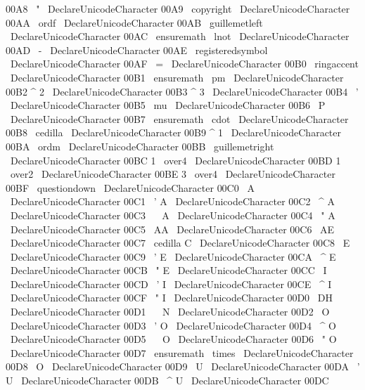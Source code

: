 {{{{{{
00A8
}
{
\
"
{
}
}
%
\
DeclareUnicodeCharacter
{
00A9
}
{
\
copyright
{
}
}
%
\
DeclareUnicodeCharacter
{
00AA
}
{
\
ordf
}
%
\
DeclareUnicodeCharacter
{
00AB
}
{
\
guillemetleft
{
}
}
%
\
DeclareUnicodeCharacter
{
00AC
}
{
\
ensuremath
\
lnot
}
%
\
DeclareUnicodeCharacter
{
00AD
}
{
\
-
}
%
\
DeclareUnicodeCharacter
{
00AE
}
{
\
registeredsymbol
{
}
}
%
\
DeclareUnicodeCharacter
{
00AF
}
{
\
=
{
}
}
%
%
\
DeclareUnicodeCharacter
{
00B0
}
{
\
ringaccent
{
}
}
%
\
DeclareUnicodeCharacter
{
00B1
}
{
\
ensuremath
\
pm
}
%
\
DeclareUnicodeCharacter
{
00B2
}
{
^
2
}
%
\
DeclareUnicodeCharacter
{
00B3
}
{
^
3
}
%
\
DeclareUnicodeCharacter
{
00B4
}
{
\
'
{
}
}
%
\
DeclareUnicodeCharacter
{
00B5
}
{
\
mu
}
%
\
DeclareUnicodeCharacter
{
00B6
}
{
\
P
}
%
\
DeclareUnicodeCharacter
{
00B7
}
{
\
ensuremath
\
cdot
}
%
\
DeclareUnicodeCharacter
{
00B8
}
{
\
cedilla
{
}
}
%
\
DeclareUnicodeCharacter
{
00B9
}
{
^
1
}
%
\
DeclareUnicodeCharacter
{
00BA
}
{
\
ordm
}
%
\
DeclareUnicodeCharacter
{
00BB
}
{
\
guillemetright
{
}
}
%
\
DeclareUnicodeCharacter
{
00BC
}
{
1
\
over4
}
%
\
DeclareUnicodeCharacter
{
00BD
}
{
1
\
over2
}
%
\
DeclareUnicodeCharacter
{
00BE
}
{
3
\
over4
}
%
\
DeclareUnicodeCharacter
{
00BF
}
{
\
questiondown
}
%
%
\
DeclareUnicodeCharacter
{
00C0
}
{
\
A
}
%
\
DeclareUnicodeCharacter
{
00C1
}
{
\
'
A
}
%
\
DeclareUnicodeCharacter
{
00C2
}
{
\
^
A
}
%
\
DeclareUnicodeCharacter
{
00C3
}
{
\
~
A
}
%
\
DeclareUnicodeCharacter
{
00C4
}
{
\
"
A
}
%
\
DeclareUnicodeCharacter
{
00C5
}
{
\
AA
}
%
\
DeclareUnicodeCharacter
{
00C6
}
{
\
AE
}
%
\
DeclareUnicodeCharacter
{
00C7
}
{
\
cedilla
{
C
}
}
%
\
DeclareUnicodeCharacter
{
00C8
}
{
\
E
}
%
\
DeclareUnicodeCharacter
{
00C9
}
{
\
'
E
}
%
\
DeclareUnicodeCharacter
{
00CA
}
{
\
^
E
}
%
\
DeclareUnicodeCharacter
{
00CB
}
{
\
"
E
}
%
\
DeclareUnicodeCharacter
{
00CC
}
{
\
I
}
%
\
DeclareUnicodeCharacter
{
00CD
}
{
\
'
I
}
%
\
DeclareUnicodeCharacter
{
00CE
}
{
\
^
I
}
%
\
DeclareUnicodeCharacter
{
00CF
}
{
\
"
I
}
%
%
\
DeclareUnicodeCharacter
{
00D0
}
{
\
DH
}
%
\
DeclareUnicodeCharacter
{
00D1
}
{
\
~
N
}
%
\
DeclareUnicodeCharacter
{
00D2
}
{
\
O
}
%
\
DeclareUnicodeCharacter
{
00D3
}
{
\
'
O
}
%
\
DeclareUnicodeCharacter
{
00D4
}
{
\
^
O
}
%
\
DeclareUnicodeCharacter
{
00D5
}
{
\
~
O
}
%
\
DeclareUnicodeCharacter
{
00D6
}
{
\
"
O
}
%
\
DeclareUnicodeCharacter
{
00D7
}
{
\
ensuremath
\
times
}
%
\
DeclareUnicodeCharacter
{
00D8
}
{
\
O
}
%
\
DeclareUnicodeCharacter
{
00D9
}
{
\
U
}
%
\
DeclareUnicodeCharacter
{
00DA
}
{
\
'
U
}
%
\
DeclareUnicodeCharacter
{
00DB
}
{
\
^
U
}
%
\
DeclareUnicodeCharacter
{
00DC
}}}}}}
